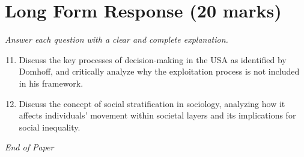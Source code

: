 \documentclass[12pt]{article}
\begin{document}
\section*{Long Form Response (20 marks)}
\textit{Answer each question with a clear and complete explanation.}
\begin{enumerate}[label=\arabic*.]
\setcounter{enumi}{10}
\item Discuss the key processes of decision-making in the USA as identified by Domhoff, and critically analyze why the exploitation process is not included in his framework.
\item Discuss the concept of social stratification in sociology, analyzing how it affects individuals' movement within societal layers and its implications for social inequality.
\end{enumerate}

\vfill
\noindent\textit{End of Paper}
\end{document}
